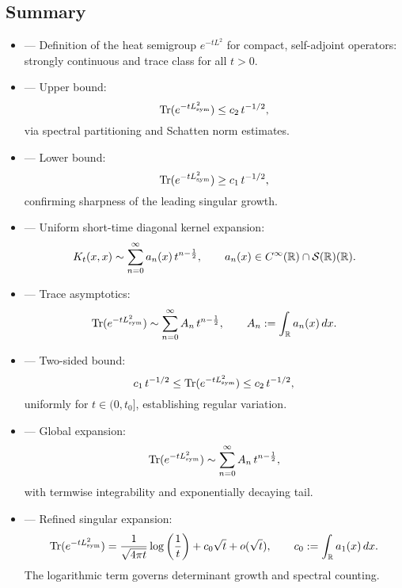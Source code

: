 \subsection*{Summary}

\begin{itemize}
  \item {} — Definition of the heat semigroup \( e^{-tL^2} \) for compact, self-adjoint operators: strongly continuous and trace class for all \( t > 0 \).

  \item {} — Upper bound:
  \[
  \operatorname{Tr}(e^{-tL_{\mathrm{sym}}^2}) \leq c_2\, t^{-1/2},
  \]
  via spectral partitioning and Schatten norm estimates.

  \item {} — Lower bound:
  \[
  \operatorname{Tr}(e^{-tL_{\mathrm{sym}}^2}) \geq c_1\, t^{-1/2},
  \]
  confirming sharpness of the leading singular growth.

  \item {} — Uniform short-time diagonal kernel expansion:
  \[
  K_t(x,x) \sim \sum_{n=0}^\infty a_n(x)\, t^{n - \frac{1}{2}}, \qquad a_n(x) \in C^\infty(\mathbb{R}) \cap \mathcal{S}(\mathbb{R})(\mathbb{R}).
  \]

  \item {} — Trace asymptotics:
  \[
  \operatorname{Tr}(e^{-tL_{\mathrm{sym}}^2}) \sim \sum_{n=0}^\infty A_n\, t^{n - \frac{1}{2}}, \qquad
  A_n := \int_{\mathbb{R}} a_n(x)\, dx.
  \]

  \item {} — Two-sided bound:
  \[
  c_1\, t^{-1/2} \leq \operatorname{Tr}(e^{-tL_{\mathrm{sym}}^2}) \leq c_2\, t^{-1/2},
  \]
  uniformly for \( t \in (0, t_0] \), establishing regular variation.

  \item {} — Global expansion:
  \[
  \operatorname{Tr}(e^{-tL_{\mathrm{sym}}^2}) \sim \sum_{n=0}^\infty A_n\, t^{n - \frac{1}{2}},
  \]
  with termwise integrability and exponentially decaying tail.

  \item {} — Refined singular expansion:
  \[
  \operatorname{Tr}(e^{-tL_{\mathrm{sym}}^2})
  = \frac{1}{\sqrt{4\pi t}} \log\left( \frac{1}{t} \right)
  + c_0 \sqrt{t} + o(\sqrt{t}), \qquad c_0 := \int_{\mathbb{R}} a_1(x)\, dx.
  \]
  The logarithmic term governs determinant growth and spectral counting.


\end{itemize}

